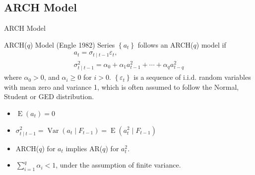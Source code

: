 \documentclass{beamer}
\begin{document}
\subsection{ARCH Model}
\begin{frame}{ARCH Model}
  \begin{block}{ARCH($q$) Model (Engle 1982)}
    Series $\left\{a_{t}\right\}$ follows an ARCH($q$) model if
    \begin{displaymath}
      \begin{array}{c} %
        a_{t}=\sigma_{t \mid t-1} \varepsilon_{t}, \\
        \sigma_{t \mid t-1}^{2}=\alpha_{0}+\alpha_{1} a_{t-1}^{2}+\cdots+\alpha_{q} a_{t-q}^{2}
      \end{array}
    \end{displaymath}
    where $\alpha_{0} > 0$, and $\alpha_{i} \geqslant 0$ for $i > 0$. ${\left\{\varepsilon_{t}\right\}}$ is a sequence of i.i.d. random variables with mean zero and variance 1, which is often assumed to follow the Normal, Student or GED distribution.
  \end{block}
  \begin{itemize}
    \item $\operatorname{E}(a_{t})=0$
    \item $\sigma_{t \mid t-1}^2 = \operatorname{Var}(a_{t} \mid F_{t-1}) = \operatorname{E}(a_{t}^2 \mid F_{t-1})$
    \item ARCH($q$) for $a_{t}$ implies AR($q$) for $a_{t}^2$.
    \item $\sum_{i=1}^q \alpha_{i} < 1$, under the assumption of finite variance.
  \end{itemize}
\end{frame}
\end{document}
